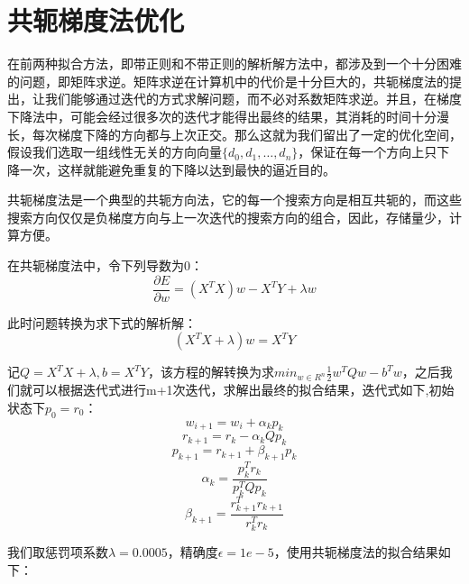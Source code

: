 \documentclass[12pt]{article}
\begin{document}
\section{共轭梯度法优化}
在前两种拟合方法，即带正则和不带正则的解析解方法中，都涉及到一个十分困难的问题，即矩阵求逆。矩阵求逆在计算机中的代价是十分巨大的，共轭梯度法的提出，让我们能够通过迭代的方式求解问题，而不必对系数矩阵求逆。并且，在梯度下降法中，可能会经过很多次的迭代才能得出最终的结果，其消耗的时间十分漫长，每次梯度下降的方向都与上次正交。那么这就为我们留出了一定的优化空间，假设我们选取一组线性无关的方向向量$\{d_0,d_1,\dots,d_n\}$，保证在每一个方向上只下降一次，这样就能避免重复的下降以达到最快的逼近目的。\par
共轭梯度法是一个典型的共轭方向法，它的每一个搜索方向是相互共轭的，而这些搜索方向仅仅是负梯度方向与上一次迭代的搜索方向的组合，因此，存储量少，计算方便。\par
在共轭梯度法中，令下列导数为0：
\[\frac{\partial{E}}{\partial w}=(X^TX)w-X^TY+\lambda w\]\par
此时问题转换为求下式的解析解：
\[(X^TX+\lambda)w=X^TY\]\par
记$Q=X^TX+\lambda,b=X^TY$，该方程的解转换为求$min_{w\in R^n}\frac{1}{2}w^TQw-b^Tw$，之后我们就可以根据迭代式进行m+1次迭代，求解出最终的拟合结果，迭代式如下,初始状态下$p_0=r_0$：
\[w_{i+1}=w_i+\alpha_kp_k\]
\[r_{k+1}=r_k-\alpha_kQp_k\]
\[p_{k+1}=r_{k+1}+\beta_{k+1}p_k\]
\[\alpha_k=\frac{p_k^Tr_k}{p_k^TQp_k}\]
\[\beta_{k+1}=\frac{r_{k+1}^Tr_{k+1}}{r_k^Tr_k}\]\par
我们取惩罚项系数$\lambda=0.0005$，精确度$\epsilon=1e-5$，使用共轭梯度法的拟合结果如下：
\end{document}
